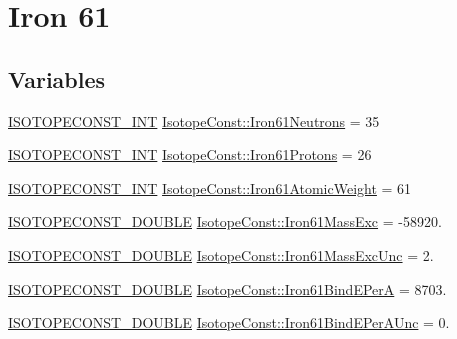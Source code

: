 \hypertarget{group___isotope_const-_iron-_fe61}{}\section{Iron 61}
\label{group___isotope_const-_iron-_fe61}
\subsection*{Variables}
\begin{DoxyCompactItemize}
\item 
\mbox{\hyperlink{group___isotope_const-_macros_ga5f18360b3e99483a35c32d789e62621c}{I\+S\+O\+T\+O\+P\+E\+C\+O\+N\+S\+T\+\_\+\+I\+NT}} \mbox{\hyperlink{group___isotope_const-_iron-_fe61_ga3f12b99650ae787868314b7c54fc4fd2}{Isotope\+Const\+::\+Iron61\+Neutrons}} = 35
\item 
\mbox{\hyperlink{group___isotope_const-_macros_ga5f18360b3e99483a35c32d789e62621c}{I\+S\+O\+T\+O\+P\+E\+C\+O\+N\+S\+T\+\_\+\+I\+NT}} \mbox{\hyperlink{group___isotope_const-_iron-_fe61_ga86ff86dd79704c33699a4ae6b777ba71}{Isotope\+Const\+::\+Iron61\+Protons}} = 26
\item 
\mbox{\hyperlink{group___isotope_const-_macros_ga5f18360b3e99483a35c32d789e62621c}{I\+S\+O\+T\+O\+P\+E\+C\+O\+N\+S\+T\+\_\+\+I\+NT}} \mbox{\hyperlink{group___isotope_const-_iron-_fe61_gac968b4acfc866cef6ac7592415739f15}{Isotope\+Const\+::\+Iron61\+Atomic\+Weight}} = 61
\item 
\mbox{\hyperlink{group___isotope_const-_macros_ga8f45a7272ce02c0b4c65c44636ed719a}{I\+S\+O\+T\+O\+P\+E\+C\+O\+N\+S\+T\+\_\+\+D\+O\+U\+B\+LE}} \mbox{\hyperlink{group___isotope_const-_iron-_fe61_ga60d24e32c691d9efadcd8e83c7823463}{Isotope\+Const\+::\+Iron61\+Mass\+Exc}} = -\/58920.
\item 
\mbox{\hyperlink{group___isotope_const-_macros_ga8f45a7272ce02c0b4c65c44636ed719a}{I\+S\+O\+T\+O\+P\+E\+C\+O\+N\+S\+T\+\_\+\+D\+O\+U\+B\+LE}} \mbox{\hyperlink{group___isotope_const-_iron-_fe61_ga1a427a6fb233fadc457410ee9f6e6e17}{Isotope\+Const\+::\+Iron61\+Mass\+Exc\+Unc}} = 2.
\item 
\mbox{\hyperlink{group___isotope_const-_macros_ga8f45a7272ce02c0b4c65c44636ed719a}{I\+S\+O\+T\+O\+P\+E\+C\+O\+N\+S\+T\+\_\+\+D\+O\+U\+B\+LE}} \mbox{\hyperlink{group___isotope_const-_iron-_fe61_gaa07e47dd17102813ef6b034c6e7e290b}{Isotope\+Const\+::\+Iron61\+Bind\+E\+PerA}} = 8703.
\item 
\mbox{\hyperlink{group___isotope_const-_macros_ga8f45a7272ce02c0b4c65c44636ed719a}{I\+S\+O\+T\+O\+P\+E\+C\+O\+N\+S\+T\+\_\+\+D\+O\+U\+B\+LE}} \mbox{\hyperlink{group___isotope_const-_iron-_fe61_gaaef6cc67cfd46a57700119c4fdbc7587}{Isotope\+Const\+::\+Iron61\+Bind\+E\+Per\+A\+Unc}} = 0.

\end{DoxyCompactItemize}
